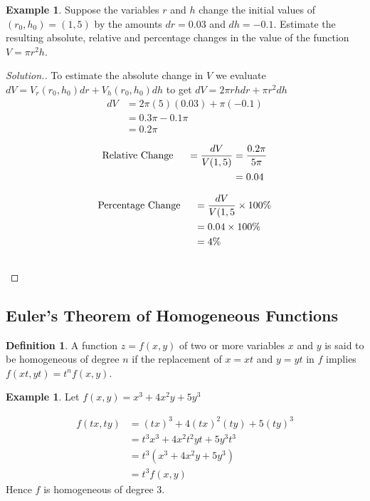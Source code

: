 \documentclass[11pt,a4paper]{article}
\theoremstyle{definition}
\newtheorem{defn}[thm]{Definition}
\newtheorem{exa}[thm]{Example}
\newenvironment{solution}
  {\renewcommand{\qedsymbol}{}\begin{proof}[\textit{Solution}.]}
  {\end{proof}}
\begin{document}
\begin{exa}


Suppose the variables $r$ and $h$ change the initial values of $(r_0,h_0) = (1,5)$ by the amounts $dr = 0.03$ and $dh = - 0.1$. Estimate the resulting absolute, relative and percentage changes in the value of the function $V = \pi r^2 h$.
\end{exa}


\begin{solution}


To estimate the absolute change in $V$ we evaluate $dV = V_r (r_0,h_0)dr + V_h(r_0,h_0)dh$ to get $dV = 2\pi rh dr + \pi r^2 dh$
\begin{align*}
dV & = 2\pi (5)(0.03) + \pi (-0.1)\\
& = 0.3\pi - 0.1\pi\\
& = 0.2\pi
\end{align*}

\begin{align*}
\text{Relative Change}\hspace{0.5cm}= \dfrac{dV}{V(1,5)} & = \frac{0.2\pi}{5\pi}\\
& = 0.04
\end{align*}

\begin{align*}
\text{Percentage Change}\hspace{0.5cm} & = \dfrac{dV}{V(1,5} \times 100\%\\
& = 0.04\times 100\%\\
& = 4\%\\\\
\end{align*}
\end{solution}

\subsection{Euler's Theorem of Homogeneous Functions}

\begin{defn}


A function $z = f(x,y)$ of two or more variables $x$ and $y$ is said to be homogeneous of degree $n$ if the replacement of $x = xt$ and $y = yt$ in $f$ implies $f(xt,yt) = t^n f(x,y)$.
\end{defn}


\begin{exa}


Let $f(x,y) = x^3 + 4x^2y + 5y^3$

\begin{align*}
f(tx,ty) & = (tx)^3 + 4(tx)^2(ty) + 5(ty)^3\\
& = t^3x^3 + 4x^2t^2yt + 5y^3t^3\\
& = t^3 (x^3 + 4x^2y + 5y^3)\\
& = t^3 f(x,y)
\end{align*}
Hence $f$ is homogeneous of degree 3.
\end{exa}
\end{document}
